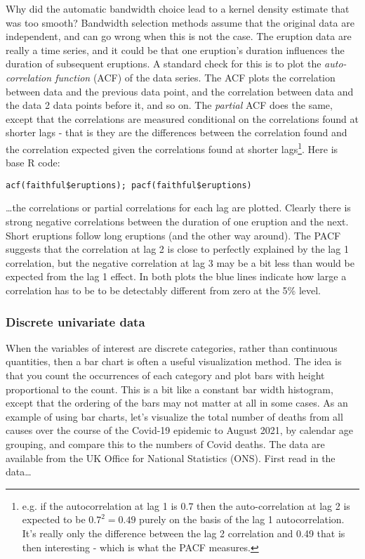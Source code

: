 \documentclass[10pt] {article}
\newcommand{\eps}[3]
{{\begin{center}
 \rotatebox{#1}{\scalebox{#2}{\texttt{[image: \#3]}}}
 \end{center}}
}
\theoremstyle{definition}
\begin{document}
Why did the automatic bandwidth choice lead to a kernel density estimate that was too smooth? Bandwidth selection methods assume that the original data are independent, and can go wrong when this is not the case. The eruption data are really a time series, and it could be that one eruption's duration influences the duration of subsequent eruptions. A standard check for this is to plot the {\em auto-correlation function} (ACF) of the data series. The ACF plots the correlation between data and the previous data point, and the correlation between data and the data 2 data points before it, and so on. The {\em partial} ACF does the same, except that the correlations are measured conditional on the correlations found at shorter lags - that is they are the differences between the correlation found and the correlation expected given the correlations found at shorter lags\footnote{e.g. if the autocorrelation at lag 1 is $0.7$ then the auto-correlation at lag 2 is expected to be $0.7^2 = 0.49$ purely on the basis of the lag 1 autocorrelation. It's really only the difference between the lag 2 correlation and 0.49 that is then interesting - which is what the PACF measures.}. Here is base R code:
\begin{lstlisting}
acf(faithful$eruptions); pacf(faithful$eruptions)
\end{lstlisting}
\eps{-90}{.6}{geyser-acf.eps}    
\ldots the correlations or partial correlations for each lag are plotted. Clearly there is strong negative correlations between the duration of one eruption and the next. Short eruptions follow long eruptions (and the other way around). The PACF suggests that the correlation at lag 2 is close to perfectly explained by the lag 1 correlation, but the negative correlation at lag 3 may be a bit less than would be expected from the lag 1 effect. In both plots the blue lines indicate how large a correlation has to be to be detectably different from zero at the 5\% level.  

\subsubsection{Discrete univariate data}

When the variables of interest are discrete categories, rather than continuous quantities, then a bar chart is often a useful visualization method. The idea is that you count the occurrences of each category and plot bars with height proportional to the count. This is a bit like a constant bar width histogram, except that the ordering of the bars may not matter at all in some cases. As an example of using bar charts, let's visualize the total number of deaths from all causes over the course of the Covid-19 epidemic to August 2021, by calendar age grouping, and compare this to the numbers of Covid deaths. The data are available from the UK Office for National Statistics (ONS). First read in the data\ldots
\end{document}
